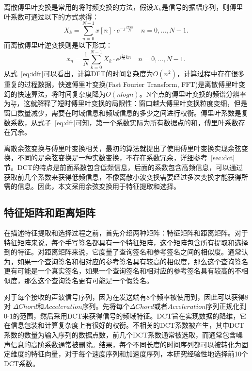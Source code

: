 离散傅里叶变换是常用的将时频变换的方法，假设$X_{k}$是信号的振幅序列，则傅里叶系数可通过以下的方式求得：
\begin{equation}
X_{k} = \sum_{n=0}^{N-1}x[n] \cdot e^{-j\frac{2\pi kn}{N}} \quad n=0,...,N-1.  \label{eq:dft}
\end{equation}
而离散傅里叶逆变换则是以下形式：
\begin{equation}
 x_{n} = \frac{1}{N}\sum_{k=0}^{N-1}X_{k} \cdot e^{j\frac{2\pi}{N}kn} \quad n=0,...,N-1. \label{eq:idft}
\end{equation}
从式~\ref{eq:idft}可以看出，计算DFT的时间复杂度为$O(n^{2})$，计算过程中存在很多重复的过程数据，快速傅里叶变换(Fast Fourier Transform, FFT)是离散傅里叶变幻的快速算法，将时间复杂度降为$O(nlog n)$。N个点的傅里叶变换的频谱分辨率为$\frac{2\pi}{N}$，这就解释了短时傅里叶变换的局限性：窗口越大傅里叶变换粒度变细，但是窗口数量减少，需要在时域信息和频域信息的多少之间进行权衡。傅里叶系数是复数系数，从式子~\ref{eq:dft}可知，第一个系数实际为所有数据点的和，傅里叶系数存在冗余。

离散余弦变换与傅里叶变换相关，最初的算法就提出了使用傅里叶变换实现余弦变换，不同的是余弦变换是一种实数变换，不存在系数冗余，详细参考~\ref{sec:dct}节。DCT的特点是前面系数包含低频信息，后面的系数包含高频信息，可以通过获取前几个系数来获得低频信息，不像离散小波变换需要经过多次变换才能获得所需的信息。因此，本文采用余弦变换用于特征提取和选择。

\subsection{特征矩阵和距离矩阵}  \label{sec:feature-distance-matrix}
在描述特征提取和选择过程之前，首先介绍两种矩阵：特征矩阵和距离矩阵。对于特征矩阵来说，每个手写签名都具有一个特征矩阵，这个矩阵包含所有提取和选择到的特征。对距离矩阵来说，它度量了查询签名和参考签名之间的相似度。通常认为，如果一个查询签名和相对应的参考签名具有较高的相似度，那么这个查询签名更有可能是一个真实签名，如果一个查询签名和相对应的参考签名具有较高的不相似度，那么这个查询签名更有可能是一个假签名。

对于每个接收的声波信号序列，因为在发送端有8个频率被使用到，因此可以获得8对 $\Delta Chord$和$Acceleration$序列。先将每个$\Delta Chord$或者$Acceleration$序列正规化到0-1的范围，然后采用DCT来获得信号的频域特征。DCT旨在实现数据的降维，它在信息包装和计算复杂度上有很好的权衡。不相关的DCT系数被产生，其中DCT系数的数量为输入序列的数据点数，前几个DCT系数通常被选取，而通常包含噪声信息的高阶系数通常被删除。结果，每个不同长度的时间序列都可以被转化为固定维度的特征向量，对于每个速度序列和加速度序列，本研究经验性地选择前10个DCT系数。

